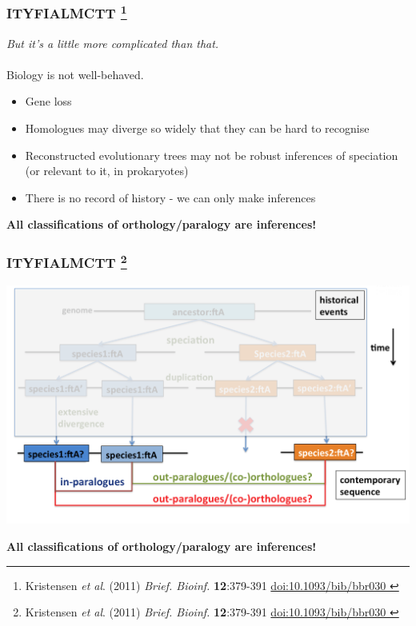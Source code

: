 % 
\begin{frame}
  \frametitle{ITYFIALMCTT
    \footnote{\tiny{Kristensen \textit{et al}. (2011) \textit{Brief. Bioinf.} \textbf{12}:379-391 \href{http://dx.doi.org/10.1093/bib/bbr030}{doi:10.1093/bib/bbr030
    }}}
    }
  \textit{But it's a little more complicated than that.} \\~\\
  Biology is not well-behaved.
  \begin{itemize}
    \item \textcolor{RawSienna}{Gene loss}
    \item \textcolor{hutton_green}{Homologues may diverge so widely that they can be hard to recognise}
    \item \textcolor{hutton_blue}{Reconstructed evolutionary trees may not be robust inferences of speciation (or relevant to it, in prokaryotes)}
    \item \textcolor{hutton_purple}{There is no record of history - we can only make inferences}
  \end{itemize}
  \textbf{All classifications of orthology/paralogy are inferences!}
\end{frame}

% 
\begin{frame}
  \frametitle{ITYFIALMCTT
    \footnote{\tiny{Kristensen \textit{et al}. (2011) \textit{Brief. Bioinf.} \textbf{12}:379-391 \href{http://dx.doi.org/10.1093/bib/bbr030}{doi:10.1093/bib/bbr030
    }}}
    }
  \begin{center}
    \includegraphics[width=1\textwidth]{images/logues6}  
  \end{center} 
  \textbf{All classifications of orthology/paralogy are inferences!}
\end{frame}


